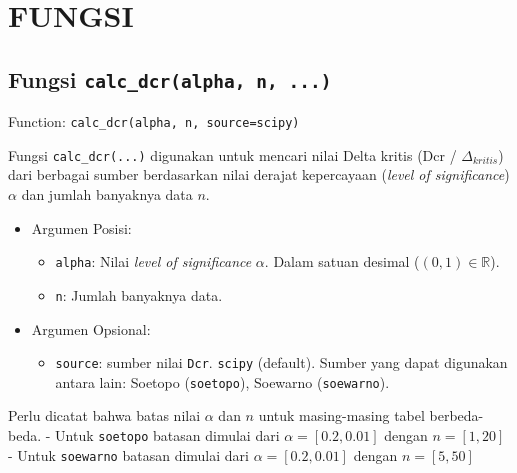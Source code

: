 \documentclass[11pt]{article}
\providecommand{\tightlist}{%
      \setlength{\itemsep}{0pt}\setlength{\parskip}{0pt}}
\begin{document}
    \hypertarget{fungsi}{%
\section{FUNGSI}\label{fungsi}}

    \hypertarget{fungsi-calc_dcralpha-n-...}{%
\subsection{\texorpdfstring{Fungsi
\texttt{calc\_dcr(alpha,\ n,\ ...)}}{Fungsi calc\_dcr(alpha, n, ...)}}\label{fungsi-calc_dcralpha-n-...}}

Function:
\texttt{calc\_dcr(alpha,\ n,\ source=\textquotesingle{}scipy\textquotesingle{})}

Fungsi \texttt{calc\_dcr(...)} digunakan untuk mencari nilai Delta
kritis (Dcr / \(\Delta_{kritis}\)) dari berbagai sumber berdasarkan
nilai derajat kepercayaan (\emph{level of significance}) \(\alpha\) dan
jumlah banyaknya data \(n\).

\begin{itemize}
\tightlist
\item
  Argumen Posisi:

  \begin{itemize}
  \tightlist
  \item
    \texttt{alpha}: Nilai \emph{level of significance} \(\alpha\). Dalam
    satuan desimal (\(\left(0,1\right) \in \mathbb{R}\)).
  \item
    \texttt{n}: Jumlah banyaknya data.
  \end{itemize}
\item
  Argumen Opsional:

  \begin{itemize}
  \tightlist
  \item
    \texttt{source}: sumber nilai \texttt{Dcr}.
    \texttt{\textquotesingle{}scipy\textquotesingle{}} (default). Sumber
    yang dapat digunakan antara lain: Soetopo
    (\texttt{\textquotesingle{}soetopo\textquotesingle{}}), Soewarno
    (\texttt{\textquotesingle{}soewarno\textquotesingle{}}).
  \end{itemize}
\end{itemize}

Perlu dicatat bahwa batas nilai \(\alpha\) dan \(n\) untuk masing-masing
tabel berbeda-beda. - Untuk \texttt{soetopo} batasan dimulai dari
\(\alpha = \left[0.2,0.01\right]\) dengan \(n = \left[1,20\right]\) -
Untuk \texttt{soewarno} batasan dimulai dari
\(\alpha = \left[0.2,0.01\right]\) dengan \(n = \left[5,50\right]\)
\end{document}

